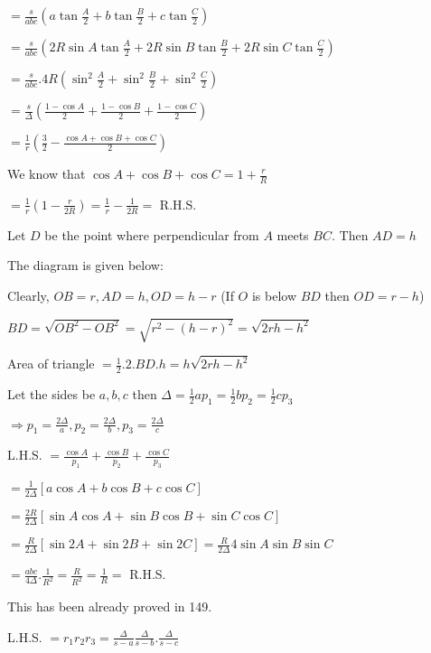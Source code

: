   $= \frac{s}{abc}\left(a\tan\frac{A}{2} + b\tan\frac{B}{2} + c\tan\frac{C}{2}\right)$

  $= \frac{s}{abc}\left(2R\sin A\tan\frac{A}{2} + 2R\sin B\tan\frac{B}{2} + 2R\sin C\tan\frac{C}{2}\right)$

  $= \frac{s}{abc}.4R\left(\sin^2\frac{A}{2} + \sin^2\frac{B}{2} + \sin^2\frac{C}{2}\right)$

  $= \frac{s}{\Delta}\left(\frac{1 - \cos A}{2} + \frac{1 - \cos B}{2} + \frac{1 - \cos C}{2}\right)$

  $= \frac{1}{r}\left(\frac{3}{2} - \frac{\cos A + \cos B + \cos C}{2}\right)$

  We know that $\cos A + \cos B + \cos C = 1 + \frac{r}{R}$

  $= \frac{1}{r}\left(1 - \frac{r}{2R}\right) = \frac{1}{r} - \frac{1}{2R} =$ R.H.S.

\item Let $D$ be the point where perpendicular from $A$ meets $BC.$ Then $AD = h$

  The diagram is given below:

  \startplacefigure
    \externalfigure[21_8.pdf]
  \stopplacefigure

  Clearly, $OB = r, AD = h, OD=h - r$ (If $O$ is below
  $BD$ then $OD = r - h$)

  $BD = \sqrt{OB^2 - OB^2} = \sqrt{r^2 - (h - r)^2} = \sqrt{2rh - h^2}$

  Area of triangle $= \frac{1}{2}.2.BD.h = h\sqrt{2rh - h^2}$

\item Let the sides be $a, b, c$ then $\Delta = \frac{1}{2}ap_1 = \frac{1}{2}bp_2 = \frac{1}{2}cp_3$

  $\Rightarrow p_1 = \frac{2\Delta}{a}, p_2 = \frac{2\Delta}{b}, p_3 = \frac{2\Delta}{c}$

  L.H.S. $= \frac{\cos A}{p_1} + \frac{\cos B}{p_2} + \frac{\cos C}{p_3}$

  $= \frac{1}{2\Delta}[a\cos A + b\cos B + c\cos C]$

  $= \frac{2R}{2\Delta}[\sin A\cos A + \sin B\cos B + \sin C\cos C]$

  $= \frac{R}{2\Delta}[\sin 2A + \sin 2B + \sin 2C] = \frac{R}{2\Delta}4\sin A\sin B\sin C$

  $= \frac{abc}{4\Delta}.\frac{1}{R^2} = \frac{R}{R^2} = \frac{1}{R} =$ R.H.S.

\item This has been already proved in 149.

\item L.H.S. $= r_1r_2r_3 = \frac{\Delta}{s - a}\frac{\Delta}{s - b}.\frac{\Delta}{s - c}$


